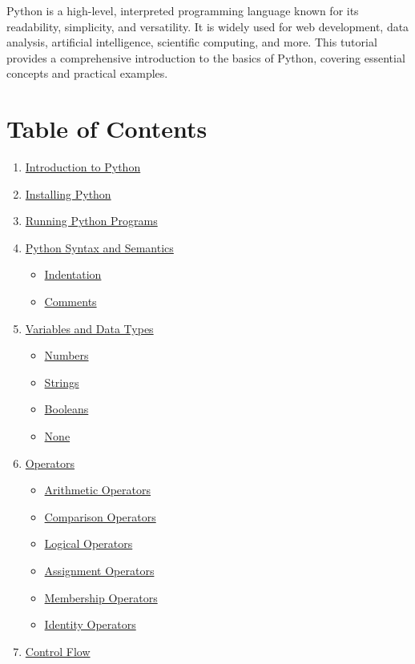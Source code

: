 \documentclass[
  letterpaper,
  DIV=11,
  numbers=noendperiod]{scrreprt}
\providecommand{\tightlist}{%
  \setlength{\itemsep}{0pt}\setlength{\parskip}{0pt}}\usepackage{longtable,booktabs,array}
\begin{document}
Python is a high-level, interpreted programming language known for its
readability, simplicity, and versatility. It is widely used for web
development, data analysis, artificial intelligence, scientific
computing, and more. This tutorial provides a comprehensive introduction
to the basics of Python, covering essential concepts and practical
examples.

\section{Table of Contents}\label{table-of-contents}

\begin{enumerate}
\def\labelenumi{\arabic{enumi}.}
\tightlist
\item
  \hyperref[introduction-to-python]{Introduction to Python}
\item
  \hyperref[installing-python]{Installing Python}
\item
  \hyperref[running-python-programs]{Running Python Programs}
\item
  \hyperref[python-syntax-and-semantics]{Python Syntax and Semantics}

  \begin{itemize}
  \tightlist
  \item
    \hyperref[indentation]{Indentation}
  \item
    \hyperref[comments]{Comments}
  \end{itemize}
\item
  \hyperref[variables-and-data-types]{Variables and Data Types}

  \begin{itemize}
  \tightlist
  \item
    \hyperref[numbers]{Numbers}
  \item
    \hyperref[strings]{Strings}
  \item
    \hyperref[booleans]{Booleans}
  \item
    \hyperref[none]{None}
  \end{itemize}
\item
  \hyperref[operators]{Operators}

  \begin{itemize}
  \tightlist
  \item
    \hyperref[arithmetic-operators]{Arithmetic Operators}
  \item
    \hyperref[comparison-operators]{Comparison Operators}
  \item
    \hyperref[logical-operators]{Logical Operators}
  \item
    \hyperref[assignment-operators]{Assignment Operators}
  \item
    \hyperref[membership-operators]{Membership Operators}
  \item
    \hyperref[identity-operators]{Identity Operators}
  \end{itemize}
\item
  \hyperref[control-flow]{Control Flow}


\end{enumerate}
\end{document}

